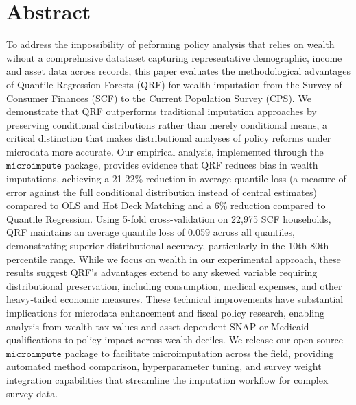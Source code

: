 \section*{Abstract}

To address the impossibility of peforming policy analysis that relies on wealth wihout a comprehnsive datataset capturing representative demographic, income and asset data across records, this paper evaluates the methodological advantages of Quantile Regression Forests (QRF) for wealth imputation from the Survey of Consumer Finances (SCF) to the Current Population Survey (CPS). We demonstrate that QRF outperforms traditional imputation approaches by preserving conditional distributions rather than merely conditional means, a critical distinction that makes distributional analyses of policy reforms under microdata more accurate. Our empirical analysis, implemented through the $\texttt{microimpute}$ package, provides evidence that QRF reduces bias in wealth imputations, achieving a 21-22\% reduction in average quantile loss (a measure of error against the full conditional distribution instead of central estimates) compared to OLS and Hot Deck Matching and a 6\% reduction compared to Quantile Regression. Using 5-fold cross-validation on 22,975 SCF households, QRF maintains an average quantile loss of 0.059 across all quantiles, demonstrating superior distributional accuracy, particularly in the 10th-80th percentile range. While we focus on wealth in our experimental approach, these results suggest QRF's advantages extend to any skewed variable requiring distributional preservation, including consumption, medical expenses, and other heavy-tailed economic measures. These technical improvements have substantial implications for microdata enhancement and fiscal policy research, enabling analysis from wealth tax values and asset-dependent SNAP or Medicaid qualifications to policy impact across wealth deciles. We release our open-source $\texttt{microimpute}$ package to facilitate microimputation across the field, providing automated method comparison, hyperparameter tuning, and survey weight integration capabilities that streamline the imputation workflow for complex survey data.